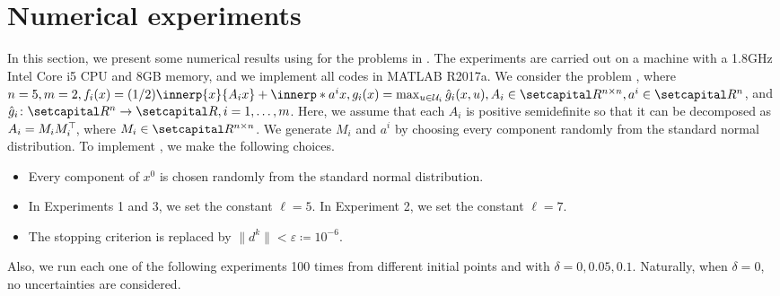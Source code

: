 \documentclass[../main]{subfiles}
\begin{document}
\section{Numerical experiments} 
In this section, we present some numerical results using  for the problems in .
The experiments are carried out on a machine with a 1.8GHz Intel Core i5 CPU and 8GB memory, and we implement all codes in MATLAB R2017a. We consider the problem , where $n = 5, m = 2, f_i(x) = (1 / 2) \innerp{x}{A_i x} + \innerp*{a^i}{x}, g_i(x) = \max_{u \in {\mathcal{U}}_i } \hat{g}_i (x,u),A_i \in \setR^{n \times n}, a^i \in \setR^n$, and $\hat{g}_i\colon \setR^n \to \setR, i = 1,\ldots, m$.
Here, we assume that each $A_i$ is positive semidefinite so that it can be decomposed as $A_i = M_i M_i^\top\hspace{-1pt}$, where $M_i \in \setR^{n \times n}$. We generate $M_i$ and $a^i$ by choosing every component randomly from the standard normal distribution. To implement , we make the following choices.
\begin{remark}
    \begin{itemize}
        \item Every component of $x^0$ is chosen randomly from the standard normal distribution.
        \item In Experiments 1 and 3, we set the constant $\ell = 5$. In Experiment 2, we set the constant $\ell = 7$.
        \item The stopping criterion is replaced by $\|d^k\| < \varepsilon \coloneqq 10^{-6}$.
    \end{itemize}
\end{remark}

Also, we run each one of the following experiments 100 times from different initial points and with $\delta = 0, 0.05, 0.1$.
Naturally, when $\delta = 0$, no uncertainties are considered.
\end{document}
